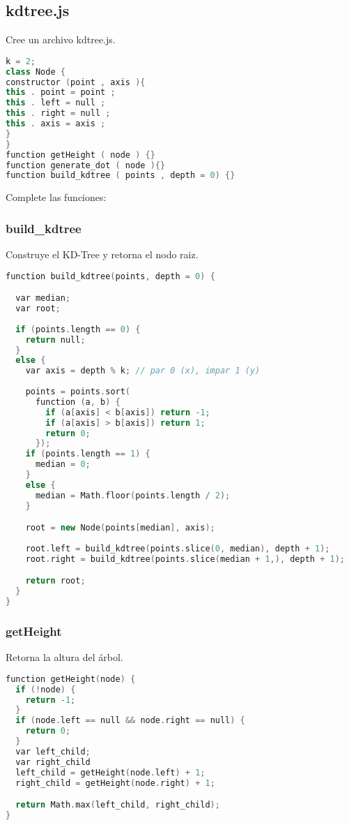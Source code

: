 \subsection{kdtree.js}
Cree un archivo kdtree.js.
\begin{lstlisting}[language=C++,
                   directivestyle={\color{black}}
                   emph={int,char,double,float,unsigned},
                   emphstyle={\color{blue}}
                  ]
k = 2;
class Node {
constructor (point , axis ){
this . point = point ;
this . left = null ;
this . right = null ;
this . axis = axis ;
}
}
function getHeight ( node ) {}
function generate_dot ( node ){}
function build_kdtree ( points , depth = 0) {}
\end{lstlisting}

Complete las funciones:
\subsubsection{build\_kdtree }Construye el KD-Tree y retorna el nodo raiz.
\begin{lstlisting}[language=C++,
                   directivestyle={\color{black}}
                   emph={int,char,double,float,unsigned},
                   emphstyle={\color{blue}}
                  ]
function build_kdtree(points, depth = 0) {

  var median;
  var root;
  
  if (points.length == 0) {
    return null;
  }
  else {
    var axis = depth % k; // par 0 (x), impar 1 (y)
    
    points = points.sort(
      function (a, b) {
        if (a[axis] < b[axis]) return -1;
        if (a[axis] > b[axis]) return 1;
        return 0;
      });
    if (points.length == 1) {
      median = 0;
    }
    else {
      median = Math.floor(points.length / 2); 
    }

    root = new Node(points[median], axis);
    
    root.left = build_kdtree(points.slice(0, median), depth + 1);
    root.right = build_kdtree(points.slice(median + 1,), depth + 1);

    return root;
  }
}
\end{lstlisting}

\newpage
\subsubsection{getHeight }Retorna la altura del árbol.
\begin{lstlisting}[language=C++,
                   directivestyle={\color{black}}
                   emph={int,char,double,float,unsigned},
                   emphstyle={\color{blue}}
                  ]
function getHeight(node) {
  if (!node) {
    return -1;
  }
  if (node.left == null && node.right == null) {
    return 0;
  }
  var left_child;
  var right_child
  left_child = getHeight(node.left) + 1;
  right_child = getHeight(node.right) + 1;

  return Math.max(left_child, right_child);
}
\end{lstlisting}

